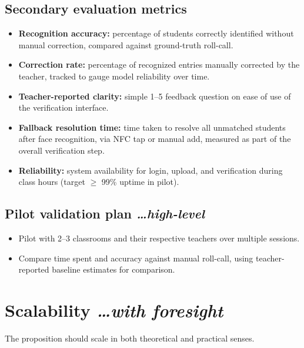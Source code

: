 \documentclass[11pt,a4paper]{article}
\newcommand{\BvrHint}[1]{%
  {\normalfont\normalsize\itshape\hfill #1}}
\begin{document}
\subsection{Secondary evaluation metrics}
\begin{itemize}[leftmargin=0.7cm]
    \item \textbf{Recognition accuracy:} percentage of students correctly identified without manual correction, compared against ground-truth roll-call.
    \item \textbf{Correction rate:} percentage of recognized entries manually corrected by the teacher, tracked to gauge model reliability over time.
    \item \textbf{Teacher-reported clarity:} simple 1--5 feedback question on ease of use of the verification interface.
    \item \textbf{Fallback resolution time:} time taken to resolve all unmatched students after face recognition, via NFC tap or manual add, measured as part of the overall verification step.
    \item \textbf{Reliability:} system availability for login, upload, and verification during class hours (target $\ge$ 99\% uptime in pilot).
\end{itemize}

\subsection{Pilot validation plan %
\BvrHint{\ldots high-level}}
\begin{itemize}[leftmargin=0.7cm]
    \item Pilot with 2--3 classrooms and their respective teachers over multiple sessions.
    \item Compare time spent and accuracy against manual roll-call, using teacher-reported baseline estimates for comparison.
\end{itemize}

\section{Scalability %
\BvrHint{\ldots with foresight}}
The proposition should scale in both theoretical and practical
senses.
\end{document}
